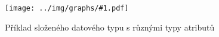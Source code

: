 \documentclass[FM,DP]{tulthesis}
\newcommand{\includeumlgraph}[2]{%
\begin{figure}
	\centering
    \texttt{[image: ../img/graphs/\#1.pdf]}
    \caption{#2}
	\label{uml:#1}
\end{figure}
}
\begin{document}
\includeumlgraph{attribute_options}{Příklad složeného datového typu s různými typy atributů}

%
%
%
%


\end{document}
